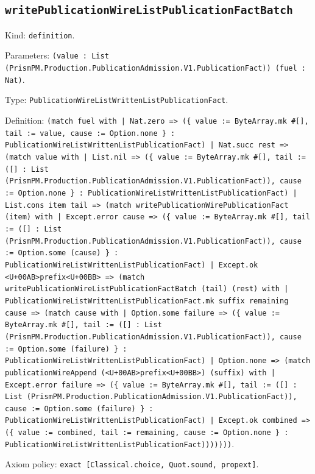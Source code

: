 \documentclass[11pt]{article}
\begin{document}
\subsection*{\texttt{writePublicationWireListPublicationFactBatch}}
\noindent Kind: \texttt{definition}.\par
\noindent Parameters: \texttt{(value : List (PrismPM.Production.PublicationAdmission.V1.PublicationFact)) (fuel : Nat)}.\par
\noindent Type: \texttt{PublicationWireListWrittenListPublicationFact}.\par
\noindent Definition: \texttt{(match fuel with | Nat.zero => (\{ value := ByteArray.mk \#[], tail := value, cause := Option.none \} : PublicationWireListWrittenListPublicationFact) | Nat.succ rest => (match value with | List.nil => (\{ value := ByteArray.mk \#[], tail := ([] : List (PrismPM.Production.PublicationAdmission.V1.PublicationFact)), cause := Option.none \} : PublicationWireListWrittenListPublicationFact) | List.cons item tail => (match writePublicationWirePublicationFact (item) with | Except.error cause => (\{ value := ByteArray.mk \#[], tail := ([] : List (PrismPM.Production.PublicationAdmission.V1.PublicationFact)), cause := Option.some (cause) \} : PublicationWireListWrittenListPublicationFact) | Except.ok <U+00AB>prefix<U+00BB> => (match writePublicationWireListPublicationFactBatch (tail) (rest) with | PublicationWireListWrittenListPublicationFact.mk suffix remaining cause => (match cause with | Option.some failure => (\{ value := ByteArray.mk \#[], tail := ([] : List (PrismPM.Production.PublicationAdmission.V1.PublicationFact)), cause := Option.some (failure) \} : PublicationWireListWrittenListPublicationFact) | Option.none => (match publicationWireAppend (<U+00AB>prefix<U+00BB>) (suffix) with | Except.error failure => (\{ value := ByteArray.mk \#[], tail := ([] : List (PrismPM.Production.PublicationAdmission.V1.PublicationFact)), cause := Option.some (failure) \} : PublicationWireListWrittenListPublicationFact) | Except.ok combined => (\{ value := combined, tail := remaining, cause := Option.none \} : PublicationWireListWrittenListPublicationFact)))))))}.\par
\noindent Axiom policy: \texttt{exact [Classical.choice, Quot.sound, propext]}.\par
\end{document}
